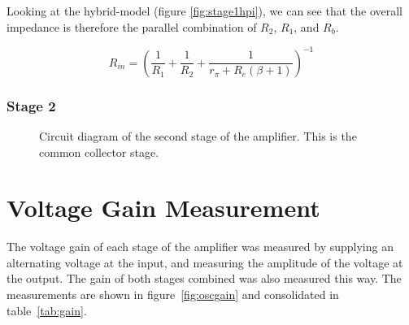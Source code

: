 \documentclass[a4paper,11pt]{article}
\begin{document}
            Looking at the hybrid-\textpi model (figure \ref{fig:stage1hpi}), we can see that the overall impedance is therefore the parallel combination of $R_2$, $R_1$, and $R_b$.
            
            \begin{equation}
                R_{in} = \left( \frac{1}{R_1} + \frac{1}{R_2} + \frac{1}{r_{\pi} + R_e (\beta + 1)} \right) ^{-1}
            \end{equation}
            
        \newpage
        \subsubsection{Stage 2}
            \begin{figure}[h]
            \centering
                
                \caption{Circuit diagram of the second stage of the amplifier. This is the common collector stage.}
                \label{fig:stage2}
            \end{figure}

\newpage
\section{Voltage Gain Measurement}
    The voltage gain of each stage of the amplifier was measured by supplying an alternating voltage at the input, and measuring the amplitude of the voltage at the output. The gain of both stages combined was also measured this way. The measurements are shown in figure~\ref{fig:oscgain} and consolidated in table~\ref{tab:gain}.
    
\end{document}
